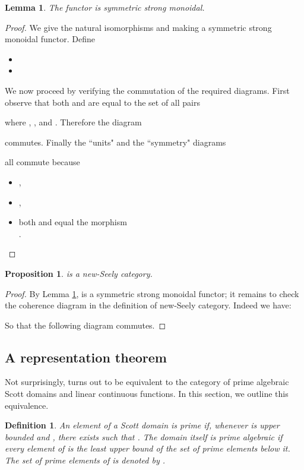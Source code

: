 \documentclass[copyright,creativecommons]{eptcs}
\newtheorem{definition}[theorem]{Definition}
\newtheorem{lemma}[theorem]{Lemma}
\newtheorem{proposition}[theorem]{Proposition}
\begin{document}
\begin{lemma}\label{SSMF}
The functor  is symmetric strong monoidal.
\end{lemma}

\begin{proof}
We give the natural isomorphisms  and  making  a symmetric strong monoidal functor. Define 
\begin{itemize}
\item 
\item 
\end{itemize}


We now proceed by verifying the commutation of the required diagrams. First observe that both  and  are equal to the set of all pairs 

where , , and . Therefore the diagram


commutes. Finally the ``units" and the ``symmetry" diagrams

all commute because 
\begin{itemize}
\item ,

\item ,

\item both  and  equal the morphism \\ 
.
\end{itemize}
\end{proof}


\begin{proposition}
 is a new-Seely category.
\end{proposition}

\begin{proof}
By Lemma \ref{SSMF},  is a symmetric strong monoidal functor; it remains to check the coherence diagram in the definition of new-Seely category. Indeed we have: 

So that the following diagram commutes.

\end{proof}



\subsection{A representation theorem}

Not surprisingly,  turns out to be equivalent to the category of prime algebraic 
Scott domains and linear continuous functions. In this section, we outline this equivalence.

\begin{definition}
An element  of a Scott domain  is \emph{prime} if, whenever  is upper bounded and , there exists  such that . The domain  itself is \emph{prime algebraic} if every element of  is the least upper bound of the set of prime elements below it. The set of prime elements of  is denoted by .
\end{definition}
\end{document}
